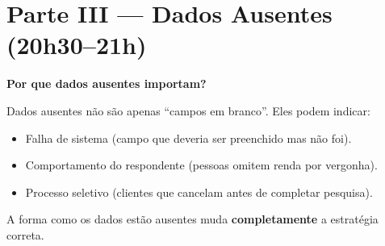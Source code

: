 \section{Parte III — Dados Ausentes (20h30–21h)}

\begin{SolvedBox}
\textbf{Por que dados ausentes importam?}

Dados ausentes não são apenas ``campos em branco''. Eles podem indicar:
\begin{itemize}
  \item Falha de sistema (campo que deveria ser preenchido mas não foi).
  \item Comportamento do respondente (pessoas omitem renda por vergonha).
  \item Processo seletivo (clientes que cancelam antes de completar pesquisa).
\end{itemize}

A forma como os dados estão ausentes muda \textbf{completamente} a estratégia correta.
\end{SolvedBox}

